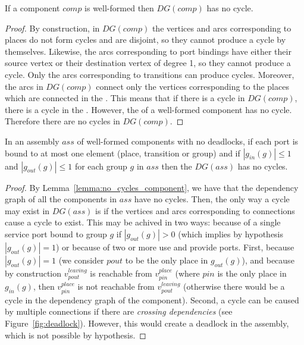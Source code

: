 \begin{lemma}
 If a component $comp$ is well-formed then $DG(comp)$ has no cycle.
 \label{lemma:no_cycles_component}
\end{lemma}

\begin{proof}
 By construction, in $DG(comp)$ the vertices and arcs corresponding to places do
 not form cycles and are disjoint, so they cannot produce a cycle by themselves.
 Likewise, the arcs corresponding to port bindings have either their source
 vertex or their destination vertex of degree 1, so they cannot produce a cycle.
 Only the arcs corresponding to transitions can produce cycles. Moreover, the
 arcs in $DG(comp)$ connect only the vertices corresponding to the places which
 are connected in the \net. This means that if there is a cycle in $DG(comp)$,
 there is a cycle in the \net. However, the \net of a well-formed \mad component
 has no cycle. Therefore there are no cycles in $DG(comp)$.
\end{proof}

\begin{lemma}
 In an assembly $ass$ of well-formed components with no deadlocks, if each port
 is bound to at most one element (place, transition or group) and if
 $\left|g_{in}(g)\right|\leq 1$ and $\left|g_{out}(g)\right|\leq 1$ for each group
 $g$ in $ass$ then the $DG(ass)$ has no cycles.
 \label{lemma:no_cycles_assembly}
\end{lemma}

\begin{proof}
 By Lemma~\ref{lemma:no_cycles_component}, we have that the dependency graph
 of all the components in $ass$ have no cycles.
 Then, the only way a cycle may exist in $DG(ass)$ is if the vertices and arcs
 corresponding to connections cause a cycle to exist.
 This may be achived in two ways: because of a single service port bound to
 group $g$ if $\left|g_{out}(g)\right|>0$ (which implies by hypothesis
 $\left|g_{out}(g)\right|=1$) or because of two or more use and provide ports.
 First, because $\left|g_{out}(g)\right|=1$ (we consider $pout$ to be the only
 place in $g_{out}(g)$), and because by construction $v_{pout}^{leaving}$ is
 reachable from $v_{pin}^{place}$ (where $pin$ is the only place in $g_{in}(g)$,
 then $v_{pin}^{place}$ is not reachable from $v_{pout}^{leaving}$ (otherwise
 there would be a cycle in the dependency graph of the component). Second, a
 cycle can be caused by multiple connections if there are \emph{crossing
 dependencies} (see Figure~\ref{fig:deadlock}). However, this would create a
 deadlock in the assembly, which is not possible by hypothesis.
\end{proof}

